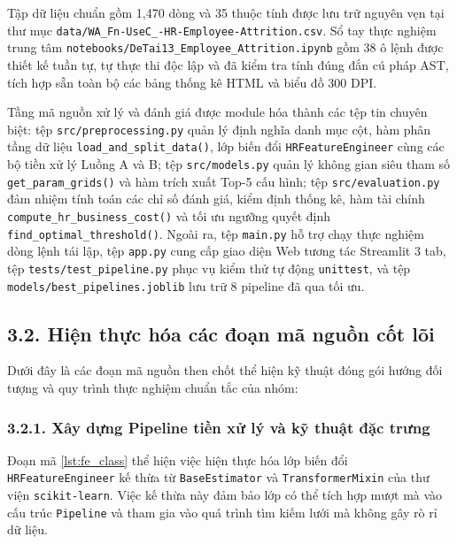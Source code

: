 \documentclass[12pt,a4paper]{article}
\begin{document}
Tập dữ liệu chuẩn gồm 1,470 dòng và 35 thuộc tính được lưu trữ nguyên vẹn tại thư mục \texttt{data/WA\_Fn-UseC\_-HR-Employee-Attrition.csv}. Sổ tay thực nghiệm trung tâm \texttt{notebooks/DeTai13\_Employee\_Attrition.ipynb} gồm 38 ô lệnh được thiết kế tuần tự, tự thực thi độc lập và đã kiểm tra tính đúng đắn cú pháp AST, tích hợp sẵn toàn bộ các bảng thống kê HTML và biểu đồ 300 DPI.

Tầng mã nguồn xử lý và đánh giá được module hóa thành các tệp tin chuyên biệt: tệp \texttt{src/preprocessing.py} quản lý định nghĩa danh mục cột, hàm phân tầng dữ liệu \texttt{load\_and\_split\_data()}, lớp biến đổi \texttt{HRFeatureEngineer} cùng các bộ tiền xử lý Luồng A và B; tệp \texttt{src/models.py} quản lý không gian siêu tham số \texttt{get\_param\_grids()} và hàm trích xuất Top-5 cấu hình; tệp \texttt{src/evaluation.py} đảm nhiệm tính toán các chỉ số đánh giá, kiểm định thống kê, hàm tài chính \texttt{compute\_hr\_business\_cost()} và tối ưu ngưỡng quyết định \texttt{find\_optimal\_threshold()}. Ngoài ra, tệp \texttt{main.py} hỗ trợ chạy thực nghiệm dòng lệnh tái lập, tệp \texttt{app.py} cung cấp giao diện Web tương tác Streamlit 3 tab, tệp \texttt{tests/test\_pipeline.py} phục vụ kiểm thử tự động \texttt{unittest}, và tệp \texttt{models/best\_pipelines.joblib} lưu trữ 8 pipeline đã qua tối ưu.

\subsection{3.2. Hiện thực hóa các đoạn mã nguồn cốt lõi}
Dưới đây là các đoạn mã nguồn then chốt thể hiện kỹ thuật đóng gói hướng đối tượng và quy trình thực nghiệm chuẩn tắc của nhóm:

\subsubsection{3.2.1. Xây dựng Pipeline tiền xử lý và kỹ thuật đặc trưng}
Đoạn mã \ref{lst:fe_class} thể hiện việc hiện thực hóa lớp biến đổi \texttt{HRFeatureEngineer} kế thừa từ \texttt{BaseEstimator} và \texttt{TransformerMixin} của thư viện \texttt{scikit-learn}. Việc kế thừa này đảm bảo lớp có thể tích hợp mượt mà vào cấu trúc \texttt{Pipeline} và tham gia vào quá trình tìm kiếm lưới mà không gây rò rỉ dữ liệu.
\end{document}
